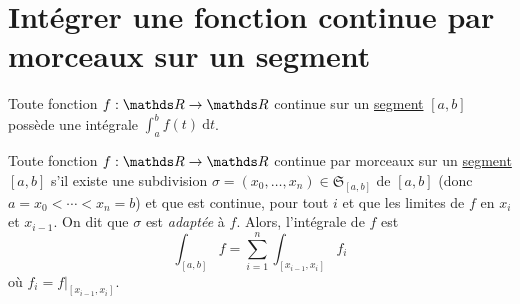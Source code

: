 \section{Intégrer une fonction continue par morceaux sur un segment}

Toute fonction $f: \R \to \R$\/ continue sur un \ul{segment} $[a,b]$\/ possède une intégrale $\int_{a}^{b} f(t)~\mathrm{d}t$.

Toute fonction $f : \R \to \R$\/ continue par morceaux sur un \ul{segment} $[a,b]$\/ s'il existe une subdivision $\sigma = (x_0, \ldots, x_n) \in \mathfrak{S}_{[a,b]}$\/ de $[a,b]$\/ (donc $a = x_0 < \cdots < x_n = b$) et que \smash{$f\big|_{]x_{i-1},x_i[}$\/} est continue, pour tout $i$\/ et que les limites de $f$\/ en $x_i$\/ et $x_{i-1}$. On dit que $\sigma$\/ est {\sl adaptée} à $f$. Alors, l'intégrale de $f$\/ est \[
	\int_{[a,b]} f = \sum_{i=1}^n \int_{[x_{i-1}, x_i]} f_i
\] où $f_i = f\big|_{[x_{i-1},x_i]}$.

